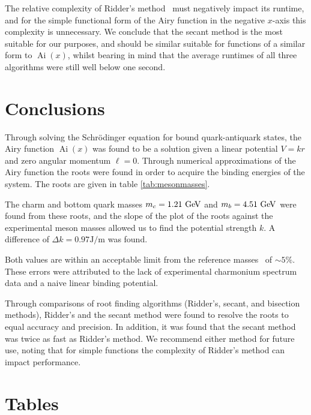 \documentclass[]{article}
\newcommand{\Ai}[1]{\ensuremath{\operatorname{Ai}({#1})}}
\begin{document}
The relative complexity of Ridder's method~\cite{ref:nr} must negatively impact its runtime, and for the simple functional form of the Airy function in the negative $x$-axis this complexity is unnecessary. We conclude that the secant method is the most suitable for our purposes, and should be similar suitable for functions of a similar form to \Ai{x}, whilst bearing in mind that the average runtimes of all three algorithms were still well below one second.

\section{Conclusions}\label{sec:conclusion}

Through solving the Schr\"{o}dinger equation for bound quark-antiquark states, the Airy function \Ai{x} was found to be a solution given a linear potential $V = kr$ and zero angular momentum $\ell = 0$. Through numerical approximations of the Airy function the roots were found in order to acquire the binding energies of the \qqbar system. The roots are given in table \ref{tab:mesonmasses}.

The charm and bottom quark masses $m_{c} = 1.21\GeV$ and $m_{b} = 4.51\GeV$ were found from these roots, and the slope of the plot of the roots against the experimental meson masses allowed us to find the potential strength $k$. A difference of $\Delta k = 0.97 \si{\joule\per\metre}$ was found.

Both values are within an acceptable limit from the reference masses~\cite{ref:pdg} of $\sim 5\%$. These errors were attributed to the lack of experimental charmonium spectrum data and a naive linear binding potential. 

Through comparisons of root finding algorithms (Ridder's, secant, and bisection methods), Ridder's and the secant method were found to resolve the roots to equal accuracy and precision. In addition, it was found that the secant method was twice as fast as Ridder's method. We recommend either method for future use, noting that for simple functions the complexity of Ridder's method can impact performance.



\section{Tables}
\end{document}
